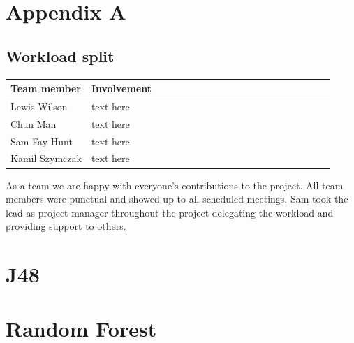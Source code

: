 \documentclass[11pt]{article}
\begin{document}
\pagebreak
\appendix
\appendixpage
\addappheadtotoc
\begin{appendices}

\section{Appendix A}


\subsection{Workload split}
  
  \begin{table}[ht]
    \centering
    \begin{tabular}{|p{0.25\linewidth} | p{0.8\linewidth}|} 
      \hline
      \textbf{Team member}  & \textbf{Involvement} \\ \hline
      Lewis Wilson & text here \\ \hline
      Chun Man & text here  \\ \hline
      Sam Fay-Hunt & text here \\ \hline
      Kamil Szymczak & text here \\ \hline
    \end{tabular}
  \end{table}\label{ContributionTab}

As a team we are happy with everyone's contributions to the project. All team members were punctual and showed up to all scheduled meetings. Sam took the lead as project manager throughout the project delegating the workload and providing support to others.


\newpage
\section{J48}





\FloatBarrier
\newpage
\section{Random Forest}


\end{appendices}
\end{document}
